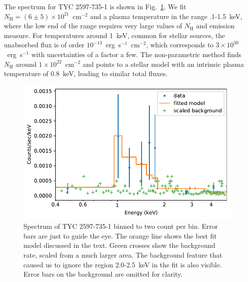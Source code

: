 \documentclass[linenumbers]{aastex631}
\begin{document}
The spectrum for TYC 2597-735-1 is shown in Fig.~\ref{fig:TYC_spec}. We fit $N_\mathrm{H}=(6\pm5)\times10^{21}$~cm$^{-2}$ and a plasma temperature in the range .1-1.5~keV, where the low end of the range requires very large values of $N_\mathrm{H}$ and emission measure. For temperatures around 1~keV, common for stellar sources, the unabsorbed flux is of order $10^{-13}$~erg~s$^{-1}$~cm$^{-2}$, which corresponds to $3\times 10^{30}$~erg~s$^{-1}$ with uncertainties of a factor a few. The non-parametric method finds $N_\mathrm{H}$ around $1\times10^{22}$~cm$^{-2}$ and points to a stellar model with an intrinsic plasma temperature of 0.8~keV, leading to similar total fluxes.
\begin{figure}
    \centering
    \includegraphics[width=\textwidth]{figures/TYC_spec.pdf}
    \caption{Spectrum of TYC 2597-735-1 binned to two count per bin. Error bars are just to guide the eye. The orange line shows the best fit model discussed in the text. Green crosses show the background rate, scaled from a much larger area. The background feature that caused us to ignore the region 2.0-2.5~keV in the fit is also visible. Error bars on the background are omitted for clarity.
    \label{fig:TYC_spec}}
\end{figure}
\end{document}
